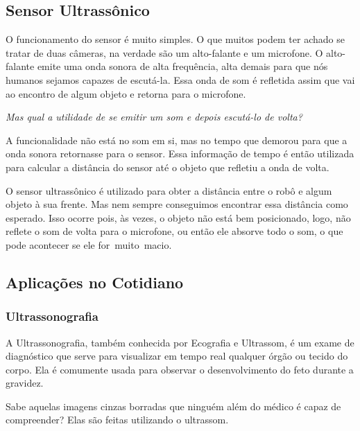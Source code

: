 \documentclass[conference]{IEEEtran}
\begin{document}
\begin{center}
       \subsection{Sensor Ultrassônico}
\end{center}
    \par
    O funcionamento do sensor é muito simples. O que muitos podem ter achado se tratar de duas câmeras, na verdade são um alto-falante e um microfone. O alto-falante emite uma onda sonora de alta frequência, alta demais para que nós humanos sejamos capazes de escutá-la. Essa onda de som é refletida assim que vai ao encontro de algum objeto e retorna para o microfone.
\par
\textit{Mas qual a utilidade de se emitir um som e depois escutá-lo de volta?}
\par
A funcionalidade não está no som em si, mas no tempo que demorou para que a onda sonora retornasse para o sensor. Essa informação de tempo é então utilizada para calcular a distância do sensor até o objeto que refletiu a onda de volta.
\par
O sensor ultrassônico é utilizado para obter a distância entre o robô e algum objeto à sua frente. Mas nem sempre conseguimos encontrar essa distância como esperado. Isso ocorre pois, às vezes, o objeto não está bem posicionado, logo, não reflete o som de volta para o microfone, ou então ele absorve todo o som, o que pode acontecer se ele for muito macio.
\begin{center}
    \subsection{Aplicações no Cotidiano}    
\end{center}
\begin{center}
    \subsubsection{Ultrassonografia}    
\end{center}
    \par
    A Ultrassonografia, também conhecida por Ecografia e Ultrassom, é um exame de diagnóstico que serve para visualizar em tempo real qualquer órgão ou tecido do corpo. Ela é comumente usada para observar o desenvolvimento do feto durante a gravidez.
    \par
    Sabe aquelas imagens cinzas borradas que ninguém além do médico é capaz de compreender? Elas são feitas utilizando o ultrassom.
\end{document}
